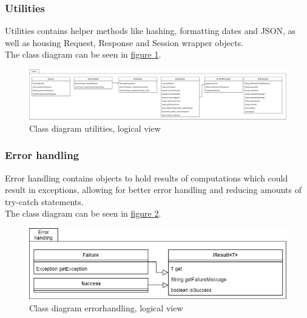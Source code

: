 \subsubsection{Utilities}
Utilities contains helper methods like hashing, formatting dates and JSON, as well as housing Request, Response and Session wrapper objects. \\
The class diagram can be seen in \hyperref[fig:classDiagramUtilities]{figure \ref{fig:classDiagramUtilities}}.
\begin{figure}[H]
    \centering
    \includegraphics[width=1.0\textwidth]{images/class_diagram_utilities.jpg}
    \caption{Class diagram utilities, logical view}
    \label{fig:classDiagramUtilities}
\end{figure}

\subsubsection{Error handling}
Error handling contains objects to hold results of computations which could result in exceptions, allowing for better error handling and reducing amounts of try-catch statements. \\
The class diagram can be seen in \hyperref[fig:classDiagramErrorhandling]{figure \ref{fig:classDiagramErrorhandling}}.
\begin{figure}[H]
    \centering
    \includegraphics[width=1.0\textwidth]{images/class_diagram_errorhandling.jpg}
    \caption{Class diagram errorhandling, logical view}
    \label{fig:classDiagramErrorhandling}
\end{figure}

